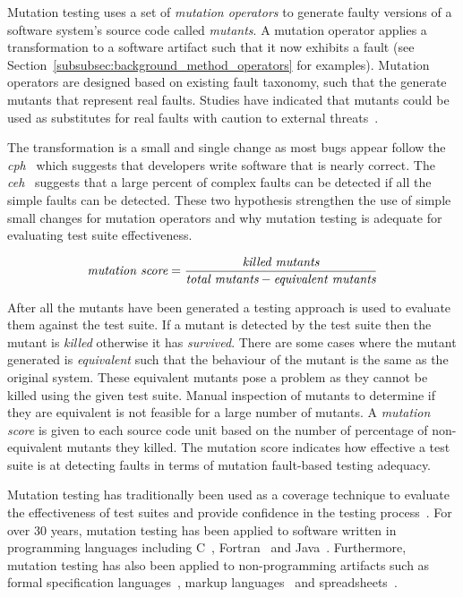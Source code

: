 Mutation testing uses a set of \emph{mutation operators} to generate faulty versions of a software system's source code called \emph{mutants}. A mutation operator applies a transformation to a software artifact such that it now exhibits a fault (see Section~\ref{subsubsec:background_method_operators} for examples). Mutation operators are designed based on existing fault taxonomy, such that the generate mutants that represent real faults. Studies have indicated that mutants could be used as substitutes for real faults with caution to external threats~\cite{ABLN06, ABL05, NK11}.

The transformation is a small and single change as most bugs appear follow the \emph{\gls{cph}}~\cite{ABD+79} which suggests that developers write software that is nearly correct. The \emph{\gls{ceh}}~\cite{Off92} suggests that a large percent of complex faults can be detected if all the simple faults can be detected. These two hypothesis strengthen the use of simple small changes for mutation operators and why mutation testing is adequate for evaluating test suite effectiveness.


\begin{equation}
  \emph{$\text{mutation score} = \frac{\text{killed mutants}}{\text{total mutants} - \text{equivalent mutants}}$}
  \label{equ:mutation_score}
\end{equation}

After all the mutants have been generated a testing approach is used to evaluate them against the test suite. If a mutant is detected by the test suite then the mutant is \emph{killed} otherwise it has \emph{survived}. There are some cases where the mutant generated is \emph{equivalent} such that the behaviour of the mutant is the same as the original system. These equivalent mutants pose a problem as they cannot be killed using the given test suite. Manual inspection of mutants to determine if they are equivalent is not feasible for a large number of mutants. A \emph{mutation score} is given to each source code unit based on the number of percentage of non-equivalent mutants they killed. The mutation score indicates how effective a test suite is at detecting faults in terms of mutation fault-based testing adequacy.

Mutation testing has traditionally been used as a coverage technique to evaluate the effectiveness of test suites and provide confidence in the testing process~\cite{JH10}. For over 30 years, mutation testing has been applied to software written in programming languages including C~\cite{DM96, JH08}, Fortran~\cite{KO91} and Java~\cite{MKO02, BCD06}. Furthermore, mutation testing has also been applied to non-programming artifacts such as formal specification languages~\cite{ABM98}, markup languages~\cite{PO10} and spreadsheets~\cite{AE09}.

